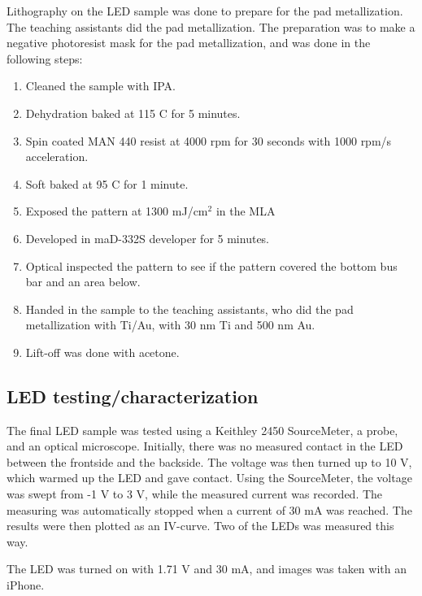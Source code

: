 Lithography on the LED sample was done to prepare for the pad metallization.
The teaching assistants did the pad metallization.
The preparation was to make a negative photoresist mask for the pad metallization, and was done in the following steps:
\begin{enumerate}
    \item Cleaned the sample with IPA.
    \item Dehydration baked at 115 \textdegree C for 5 minutes.
    \item Spin coated MAN 440 resist at 4000 rpm for 30 seconds with 1000 rpm/s acceleration.
    \item Soft baked at 95 \textdegree C for 1 minute.
    \item Exposed the pattern at 1300 mJ/cm$^2$ in the MLA
    \item Developed in maD-332S developer for 5 minutes.
    \item Optical inspected the pattern to see if the pattern covered the bottom bus bar and an area below.
    \item Handed in the sample to the teaching assistants, who did the pad metallization with Ti/Au, with 30 nm Ti and 500 nm Au.
    \item Lift-off was done with acetone.
\end{enumerate}


\subsection{LED testing/characterization}
\label{methods:LED_testing}

The final LED sample was tested using a Keithley 2450 SourceMeter, a probe, and an optical microscope.
Initially, there was no measured contact in the LED between the frontside and the backside.
The voltage was then turned up to 10 V, which warmed up the LED and gave contact. 
Using the SourceMeter, the voltage was swept from -1 V to 3 V, while the measured current was recorded.
The measuring was automatically stopped when a current of 30 mA was reached.
The results were then plotted as an IV-curve.
Two of the LEDs was measured this way. 

The LED was turned on with 1.71 V and 30 mA, and images was taken with an iPhone.